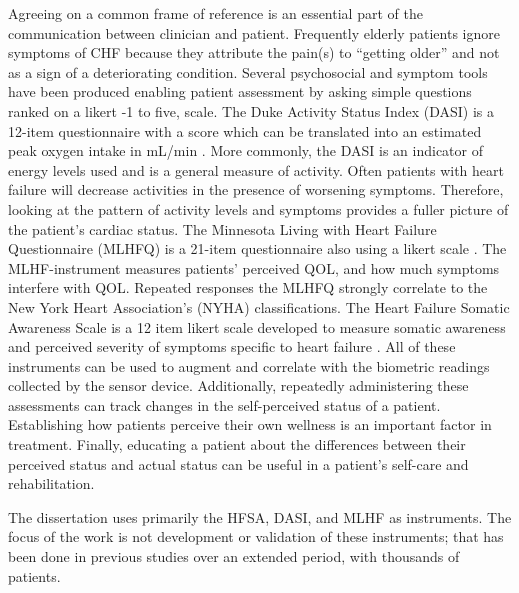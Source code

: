 Agreeing on a common frame of reference is an essential part of the communication between clinician and patient.  Frequently elderly patients ignore symptoms of CHF because they attribute the pain(s) to “getting older” and not as a sign of a deteriorating condition. Several psychosocial and symptom tools have been produced enabling patient assessment by asking simple questions ranked on a likert -1 to five, scale. The Duke Activity Status Index (DASI) is a 12-item questionnaire with a score which can be translated into an estimated peak oxygen intake in mL/min \cite{Hlatky1989}. More commonly, the DASI is an indicator of energy levels used and is a general measure of activity.  Often patients with heart failure will decrease activities in the presence of worsening symptoms. Therefore, looking at the pattern of activity levels and symptoms provides a fuller picture of the patient's cardiac status. The Minnesota Living with Heart Failure Questionnaire (MLHFQ) is a 21-item questionnaire also using a likert scale \cite{Jurgens2009}. The MLHF-instrument measures patients' perceived QOL, and how much symptoms interfere with QOL. Repeated responses the MLHFQ strongly correlate to the New York Heart Association's (NYHA) classifications. The Heart Failure Somatic Awareness Scale is a 12 item likert scale developed to measure somatic awareness and perceived severity of symptoms specific to heart failure \cite{Jurgens2006}. All of these instruments can be used to augment and correlate with the biometric readings collected by the sensor device. Additionally, repeatedly administering these assessments can track changes in the self-perceived status of a patient. Establishing how patients perceive their own wellness is an important factor in treatment. Finally, educating a patient about the differences between their perceived status and actual status can be useful in a patient's self-care and rehabilitation.

The dissertation uses primarily the HFSA, DASI, and MLHF as instruments. The focus of the work is not development or validation of these instruments; that has been done in previous studies over an extended period, with thousands of patients.

